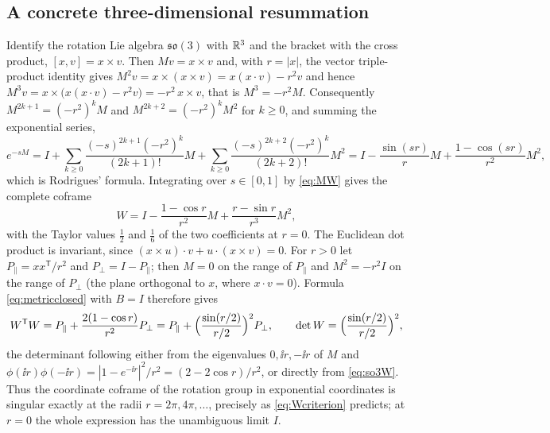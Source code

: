 \subsection{A concrete three-dimensional resummation}
Identify the rotation Lie algebra $\mathfrak{so}(3)$ with $\mathbb{R}^3$ and the
bracket with the cross product, $[x,v]=x\times v$. Then $Mv=x\times v$ and,
with $r=|x|$, the vector triple-product identity gives
$M^2v=x\times(x\times v)=x(x\cdot v)-r^2v$ and hence
$M^3v=x\times\bigl(x(x\cdot v)-r^2v\bigr)=-r^2\,x\times v$, that is
$M^3=-r^2M$. Consequently $M^{2k+1}=(-r^2)^kM$ and $M^{2k+2}=(-r^2)^kM^2$
for $k\geq0$, and summing the exponential series,
\[
 e^{-sM}=I+\sum_{k\geq0}\frac{(-s)^{2k+1}(-r^2)^k}{(2k+1)!}M
 +\sum_{k\geq0}\frac{(-s)^{2k+2}(-r^2)^k}{(2k+2)!}M^2
 =I-\frac{\sin(sr)}{r}M+\frac{1-\cos(sr)}{r^2}M^2,
\]
which is Rodrigues' formula. Integrating over $s\in[0,1]$ by
\eqref{eq:MW} gives the complete coframe
\begin{equation}\label{eq:so3W}
 W=I-\frac{1-\cos r}{r^2}M+\frac{r-\sin r}{r^3}M^2,
\end{equation}
with the Taylor values $\tfrac12$ and $\tfrac16$ of the two coefficients at
$r=0$. The Euclidean dot product is invariant, since
$(x\times u)\cdot v+u\cdot(x\times v)=0$. For $r>0$ let
$P_\parallel=xx^{\mathsf T}/r^2$ and $P_\perp=I-P_\parallel$; then $M=0$ on
the range of $P_\parallel$ and $M^2=-r^2I$ on the range of $P_\perp$ (the
plane orthogonal to $x$, where $x\cdot v=0$). Formula
\eqref{eq:metricclosed} with $B=I$ therefore gives
\begin{equation}\label{eq:so3metric}
 W^{\mathsf T}W=P_\parallel+\frac{2(1-\cos r)}{r^2}P_\perp
 =P_\parallel+\Bigl(\frac{\sin(r/2)}{r/2}\Bigr)^2P_\perp,
 \qquad
 \det W=\Bigl(\frac{\sin(r/2)}{r/2}\Bigr)^2,
\end{equation}
the determinant following either from the eigenvalues $0,\ii r,-\ii r$ of
$M$ and $\phi(\ii r)\phi(-\ii r)=|1-e^{-\ii r}|^2/r^2=(2-2\cos r)/r^2$, or
directly from \eqref{eq:so3W}. Thus the coordinate coframe of the rotation
group in exponential coordinates is singular exactly at the radii
$r=2\pi,4\pi,\ldots$, precisely as \eqref{eq:Wcriterion} predicts; at
$r=0$ the whole expression has the unambiguous limit $I$.

